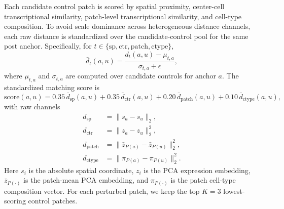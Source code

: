 \documentclass[sigconf,review,balance=false]{acmart}
\begin{document}
Each candidate control patch is scored by spatial proximity, center-cell transcriptional similarity, patch-level transcriptional similarity, and cell-type composition. To avoid scale dominance across heterogeneous distance channels, each raw distance is standardized over the candidate-control pool for the same post anchor. Specifically, for $t\in\{\mathrm{sp},\mathrm{ctr},\mathrm{patch},\mathrm{ctype}\}$,
\[
\bar d_t(a,u)=\frac{d_t(a,u)-\mu_{t,a}}{\sigma_{t,a}+\epsilon},
\]
where $\mu_{t,a}$ and $\sigma_{t,a}$ are computed over candidate controls for anchor $a$. The standardized matching score is
\[
\mathrm{score}(a,u)
=
0.35\,\bar d_{\mathrm{sp}}(a,u)
+
0.35\,\bar d_{\mathrm{ctr}}(a,u)
+
0.20\,\bar d_{\mathrm{patch}}(a,u)
+
0.10\,\bar d_{\mathrm{ctype}}(a,u),
\]
with raw channels
\[
\begin{aligned}
d_{\mathrm{sp}}
&=\|s_a-s_u\|_2,\\
d_{\mathrm{ctr}}
&=\|z_a-z_u\|_2^2,\\
d_{\mathrm{patch}}
&=\|\bar z_{P(a)}-\bar z_{P(u)}\|_2^2,\\
d_{\mathrm{ctype}}
&=\|\pi_{P(a)}-\pi_{P(u)}\|_2^2 .
\end{aligned}
\]
Here $s_i$ is the absolute spatial coordinate, $z_i$ is the PCA expression embedding, $\bar z_{P(\cdot)}$ is the patch-mean PCA embedding, and $\pi_{P(\cdot)}$ is the patch cell-type composition vector. For each perturbed patch, we keep the top $K=3$ lowest-scoring control patches.
\end{document}
